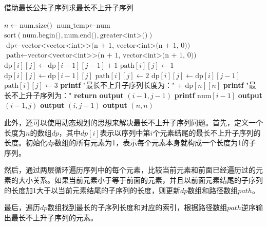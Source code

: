 \documentclass[lang=cn,11pt,a4paper]{elegantpaper}
\begin{document}
\begin{algorithm}[H]
\caption{借助最长公共子序列求最长不上升子序列}
\begin{algorithmic}[1]
    \State $n \gets \text{num.size()}$
    \State $\text{num\_temp} \gets \text{num}$
    \State $\text{sort}(\text{num.begin()}, \text{num.end()}, \text{greater<int>()})$ 
    \State $\text{dp} \gets \text{vector<vector<int>>(n + 1, vector<int>(n + 1, 0))}$
    \State $\text{path} \gets \text{vector<vector<int>>(n + 1, vector<int>(n + 1, 0))}$
                \State $\text{dp}[i][j] \gets \text{dp}[i - 1][j - 1] + 1$
                \State $\text{path}[i][j] \gets 1$
                \State $\text{dp}[i][j] \gets \text{dp}[i - 1][j]$
                \State $\text{path}[i][j] \gets 2$
            \Else
                \State $\text{dp}[i][j] \gets \text{dp}[i][j - 1]$
                \State $\text{path}[i][j] \gets 3$
            \EndIf
        \EndFor
    \EndFor
    \State \textbf{printf} "最长不上升子序列长度为：" + $\text{dp}[n][n]$
    \State \textbf{printf} "最长不上升子序列为："
            \State \textbf{return}
        \EndIf
            \State \textbf{output} $(i - 1, j - 1)$
            \State \textbf{printf} $\text{num}[i - 1]$
            \State \textbf{output} $(i - 1, j)$
        \Else
            \State \textbf{output} $(i, j - 1)$
        \EndIf
    \EndProcedure
    \State \textbf{output} $(n, n)$
\EndProcedure
\end{algorithmic}
\end{algorithm}

此外，还可以使用动态规划的思想来解决最长不上升子序列问题。首先，定义一个长度为$n$的数组$dp$，其中$dp[i]$表示以序列中第$i$个元素结尾的最长不上升子序列的长度。初始化$dp$数组的所有元素为1，表示每个元素本身就构成一个长度为1的子序列。

然后，通过两层循环遍历序列中的每个元素，比较当前元素和前面已经遍历过的元素的大小关系。如果当前元素小于等于前面的元素，并且以前面元素结尾的子序列的长度加1大于以当前元素结尾的子序列的长度，则更新$dp$数组和路径数组$path$。

最后，遍历$dp$数组找到最长的子序列长度和对应的索引，根据路径数组$path$逆序输出最长不上升子序列的元素。
\end{document}
